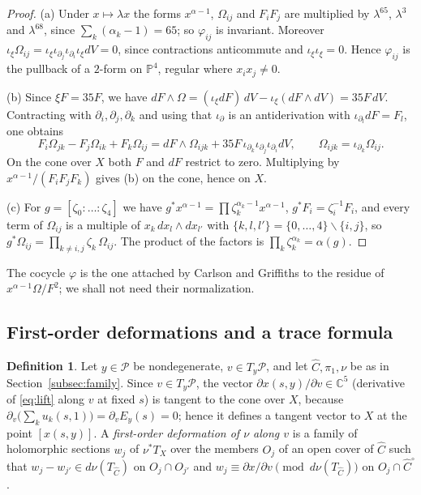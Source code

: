 \documentclass[11pt]{amsart}
\theoremstyle{definition}
\newtheorem{definition}[theorem]{Definition}
\theoremstyle{remark}
\numberwithin{equation}{section}
\newcommand{\C}{\mathbb{C}}
\newcommand{\PP}{\mathbb{P}}
\newcommand{\cP}{\mathcal{P}}
\newcommand{\sm}{\smallsetminus}
\begin{document}
\begin{proof}
(a) Under $x\mapsto\lambda x$ the forms $x^{\alpha-1}$, $\Omega_{ij}$ and $F_iF_j$ are multiplied by $\lambda^{65}$, $\lambda^3$ and $\lambda^{68}$, since $\sum_k(\alpha_k-1)=65$; so $\varphi_{ij}$ is invariant. Moreover $\iota_{\xi}\Omega_{ij}=\iota_{\xi}\iota_{\partial_j}\iota_{\partial_i}\iota_{\xi}dV=0$, since contractions anticommute and $\iota_{\xi}\iota_{\xi}=0$. Hence $\varphi_{ij}$ is the pullback of a $2$-form on $\PP^4$, regular where $x_ix_j\ne0$.

(b) Since $\xi F=35F$, we have $dF\wedge\Omega=(\iota_{\xi}dF)\,dV-\iota_{\xi}(dF\wedge dV)=35F\,dV$. Contracting with $\partial_i,\partial_j,\partial_k$ and using that $\iota_{\partial}$ is an antiderivation with $\iota_{\partial_l}dF=F_l$, one obtains
\[
F_i\Omega_{jk}-F_j\Omega_{ik}+F_k\Omega_{ij}=dF\wedge\Omega_{ijk}+35F\,\iota_{\partial_k}\iota_{\partial_j}\iota_{\partial_i}dV,\qquad \Omega_{ijk}=\iota_{\partial_k}\Omega_{ij}.
\]
On the cone over $X$ both $F$ and $dF$ restrict to zero. Multiplying by $x^{\alpha-1}/(F_iF_jF_k)$ gives (b) on the cone, hence on $X$.

(c) For $g=[\zeta_0:\dots:\zeta_4]$ we have $g^*x^{\alpha-1}=\prod\zeta_k^{\alpha_k-1}x^{\alpha-1}$, $g^*F_i=\zeta_i^{-1}F_i$, and every term of $\Omega_{ij}$ is a multiple of $x_k\,dx_l\wedge dx_{l'}$ with $\{k,l,l'\}=\{0,\dots,4\}\sm\{i,j\}$, so $g^*\Omega_{ij}=\prod_{k\ne i,j}\zeta_k\,\Omega_{ij}$. The product of the factors is $\prod_k\zeta_k^{\alpha_k}=\alpha(g)$.
\end{proof}

The cocycle $\varphi$ is the one attached by Carlson and Griffiths \cite[Section~3(b)]{CG80} to the residue of $x^{\alpha-1}\Omega/F^2$; we shall not need their normalization.

\subsection{First-order deformations and a trace formula}\label{subsec:trace}

\begin{definition}\label{def:defo}
Let $y\in\cP$ be nondegenerate, $v\in T_y\cP$, and let $\widehat C,\pi_1,\nu$ be as in Section~\ref{subsec:family}. Since $v\in T_y\cP$, the vector $\partial x(s,y)/\partial v\in\C^5$ (derivative of \eqref{eq:lift} along $v$ at fixed $s$) is tangent to the cone over $X$, because $\partial_v\bigl(\sum_ku_k(s,1)\bigr)=\partial_vE_y(s)=0$; hence it defines a tangent vector to $X$ at the point $[x(s,y)]$. A \emph{first-order deformation of $\nu$ along $v$} is a family of holomorphic sections $w_j$ of $\nu^*T_X$ over the members $O_j$ of an open cover of $\widehat C$ such that $w_j-w_{j'}\in d\nu(T_{\widehat C})$ on $O_j\cap O_{j'}$ and $w_j\equiv\partial x/\partial v\pmod{d\nu(T_{\widehat C})}$ on $O_j\cap\widehat C^\circ$.
\end{definition}
\end{document}
